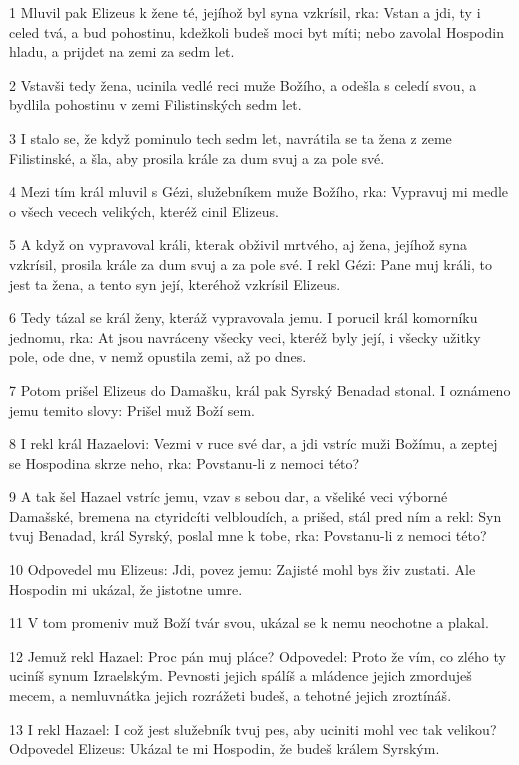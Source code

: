 \par 1 Mluvil pak Elizeus k žene té, jejíhož byl syna vzkrísil, rka: Vstan a jdi, ty i celed tvá, a bud pohostinu, kdežkoli budeš moci byt míti; nebo zavolal Hospodin hladu, a prijdet na zemi za sedm let.
\par 2 Vstavši tedy žena, ucinila vedlé reci muže Božího, a odešla s celedí svou, a bydlila pohostinu v zemi Filistinských sedm let.
\par 3 I stalo se, že když pominulo tech sedm let, navrátila se ta žena z zeme Filistinské, a šla, aby prosila krále za dum svuj a za pole své.
\par 4 Mezi tím král mluvil s Gézi, služebníkem muže Božího, rka: Vypravuj mi medle o všech vecech velikých, kteréž cinil Elizeus.
\par 5 A když on vypravoval králi, kterak obživil mrtvého, aj žena, jejíhož syna vzkrísil, prosila krále za dum svuj a za pole své. I rekl Gézi: Pane muj králi, to jest ta žena, a tento syn její, kteréhož vzkrísil Elizeus.
\par 6 Tedy tázal se král ženy, kteráž vypravovala jemu. I porucil král komorníku jednomu, rka: At jsou navráceny všecky veci, kteréž byly její, i všecky užitky pole, ode dne, v nemž opustila zemi, až po dnes.
\par 7 Potom prišel Elizeus do Damašku, král pak Syrský Benadad stonal. I oznámeno jemu temito slovy: Prišel muž Boží sem.
\par 8 I rekl král Hazaelovi: Vezmi v ruce své dar, a jdi vstríc muži Božímu, a zeptej se Hospodina skrze neho, rka: Povstanu-li z nemoci této?
\par 9 A tak šel Hazael vstríc jemu, vzav s sebou dar, a všeliké veci výborné Damašské, bremena na ctyridcíti velbloudích, a prišed, stál pred ním a rekl: Syn tvuj Benadad, král Syrský, poslal mne k tobe, rka: Povstanu-li z nemoci této?
\par 10 Odpovedel mu Elizeus: Jdi, povez jemu: Zajisté mohl bys živ zustati. Ale Hospodin mi ukázal, že jistotne umre.
\par 11 V tom promeniv muž Boží tvár svou, ukázal se k nemu neochotne a plakal.
\par 12 Jemuž rekl Hazael: Proc pán muj pláce? Odpovedel: Proto že vím, co zlého ty uciníš synum Izraelským. Pevnosti jejich spálíš a mládence jejich zmorduješ mecem, a nemluvnátka jejich rozrážeti budeš, a tehotné jejich zroztínáš.
\par 13 I rekl Hazael: I což jest služebník tvuj pes, aby uciniti mohl vec tak velikou? Odpovedel Elizeus: Ukázal te mi Hospodin, že budeš králem Syrským.
